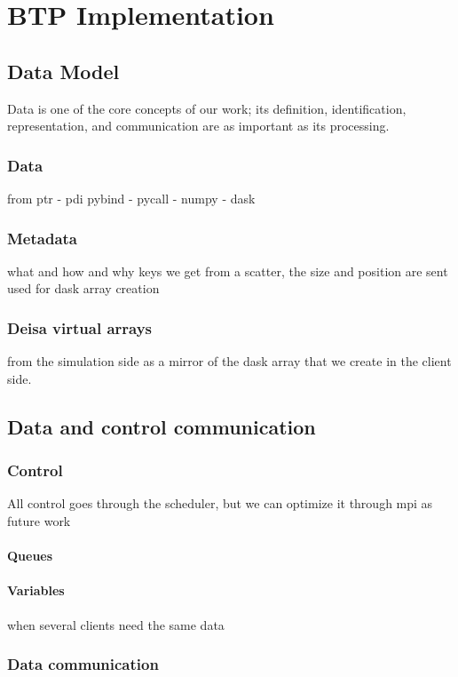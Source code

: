 \section{BTP Implementation}


\subsection{Data Model}\label{sec:datamodel}
Data is one of the core concepts of our work; its definition, identification, representation, and communication are as important as its processing. 
\subsubsection{Data}
from ptr - pdi pybind -  pycall - numpy - dask

\subsubsection{Metadata}
what and how and why 
keys we get from a scatter, the size and position are sent 
used for dask array creation 
\subsubsection{Deisa virtual arrays}
from the simulation side as a mirror of the dask array that we create in the client side.

\subsection{Data and control communication}
\subsubsection{Control}
All control goes through the scheduler, but we can optimize it through mpi as future work 
\paragraph{Queues} 

\paragraph{Variables}
when several clients need the same data 

\subsubsection{Data communication}
